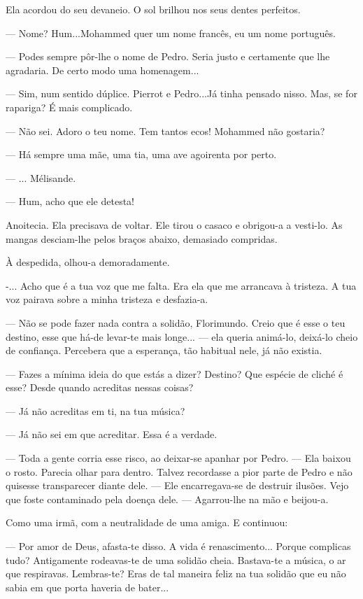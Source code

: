 Ela acordou do seu devaneio. O sol brilhou nos seus dentes perfeitos.

--- Nome? Hum...Mohammed quer um nome francês, eu um nome português.

--- Podes sempre pôr-lhe o nome de Pedro. Seria justo e certamente que lhe
agradaria. De certo modo uma homenagem...

--- Sim, num sentido dúplice. Pierrot e Pedro...Já tinha pensado nisso.
Mas, se for rapariga? É mais complicado.

--- Não sei. Adoro o teu nome. Tem tantos ecos! Mohammed não gostaria?

--- Há sempre uma mãe, uma tia, uma ave agoirenta por perto.

--- ... Mélisande.

--- Hum, acho que ele detesta!

Anoitecia. Ela precisava de voltar. Ele tirou o casaco e obrigou-a a
vesti-lo. As mangas desciam-lhe pelos braços abaixo, demasiado
compridas.

À despedida, olhou-a demoradamente.

-... Acho que é a tua voz que me falta. Era ela que me arrancava à
tristeza. A tua voz pairava sobre a minha tristeza e desfazia-a.

--- Não se pode fazer nada contra a solidão, Florimundo. Creio que é esse
o teu destino, esse que há-de levar-te mais longe... --- ela queria
animá-lo, deixá-lo cheio de confiança. Percebera que a esperança, tão
habitual nele, já não existia.

--- Fazes a mínima ideia do que estás a dizer? Destino? Que espécie de
cliché é esse? Desde quando acreditas nessas coisas?

--- Já não acreditas em ti, na tua música?

--- Já não sei em que acreditar. Essa é a verdade.

--- Toda a gente corria esse risco, ao deixar-se apanhar por Pedro. --- Ela
baixou o rosto. Parecia olhar para dentro. Talvez recordasse a pior
parte de Pedro e não quisesse transparecer diante dele. --- Ele
encarregava-se de destruir ilusões. Vejo que foste contaminado pela
doença dele. --- Agarrou-lhe na mão e beijou-a.

Como uma irmã, com a neutralidade de uma amiga. E continuou:

--- Por amor de Deus, afasta-te disso. A vida é renascimento... Porque
complicas tudo? Antigamente rodeavas-te de uma solidão cheia. Bastava-te
a música, o ar que respiravas. Lembras-te? Eras de tal maneira feliz na
tua solidão que eu não sabia em que porta haveria de bater...

